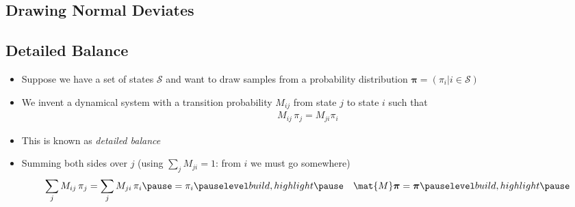 
\begin{slide}
\section{Drawing Normal Deviates}

\pause
\pb
{}
\begin{center}
  \pause
\end{center}

\end{slide}

\Outline %

\begin{slide}
\section[-1]{Detailed Balance}

\begin{PauseHighLight}
  \begin{itemize}
  \item Suppose we have a set of states $\mathcal{S}$ and want to draw
    samples from a probability distribution $\bm{\pi} = (\pi_i | i \in
    \mathcal{S})$\pause
  \item We invent a dynamical system with a transition probability $M_{ij}$ from state $j$ to
    state $i$ such that
    \begin{align*}
      M_{ij} \, \pi_j = M_{ji} \pi_i
    \end{align*}
  \item This is known as \emph{detailed balance}\pause
  \item Summing both sides over $j$\pause{} (using $\sum_j M_{ji}=1$: from $i$
    we must go somewhere)\pauseb{}
    \begin{align*}
      \sum_{j} M_{ij}\,\pi_j &= \sum_{j} M_{ji}\,\pi_i \pause = \pi_i\pauseb
      &
        \mat{M} \bm{\pi} = \bm{\pi}\pauseb
    \end{align*}
  \end{itemize}
\end{PauseHighLight}

\end{slide}


